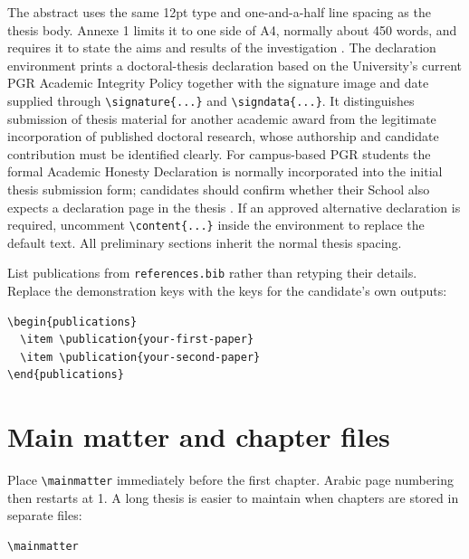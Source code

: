 \documentclass[oneside,header=auto]{liverpoolthesis}
\begin{document}
The abstract uses the same 12pt type and one-and-a-half line spacing as the thesis body. Annexe 1 limits it to one side of A4, normally about 450 words, and requires it to state the aims and results of the investigation \citep{uolformatting}. The declaration environment prints a doctoral-thesis declaration based on the University's current PGR Academic Integrity Policy together with the signature image and date supplied through \verb|\signature{...}| and \verb|\signdata{...}|. It distinguishes submission of thesis material for another academic award from the legitimate incorporation of published doctoral research, whose authorship and candidate contribution must be identified clearly. For campus-based PGR students the formal Academic Honesty Declaration is normally incorporated into the initial thesis submission form; candidates should confirm whether their School also expects a declaration page in the thesis \citep{uolpgrintegrity}. If an approved alternative declaration is required, uncomment \verb|\content{...}| inside the environment to replace the default text. All preliminary sections inherit the normal thesis spacing.

List publications from \texttt{references.bib} rather than retyping their details. Replace the demonstration keys with the keys for the candidate's own outputs:

\begin{lstlisting}[language={[LaTeX]TeX},caption={Generating the List of Publications from BibTeX data.}]
\begin{publications}
  \item \publication{your-first-paper}
  \item \publication{your-second-paper}
\end{publications}
\end{lstlisting}

\section{Main matter and chapter files}

Place \verb|\mainmatter| immediately before the first chapter. Arabic page numbering then restarts at 1. A long thesis is easier to maintain when chapters are stored in separate files:

\begin{lstlisting}[language={[LaTeX]TeX},caption={Including separate chapter files.}]
\mainmatter





\end{lstlisting}
\end{document}
